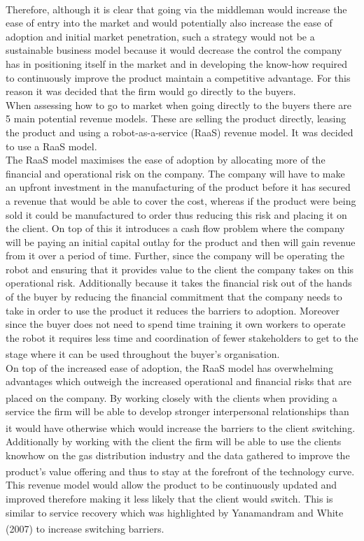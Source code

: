 \documentclass[11pt]{article}		%
\newcommand{\supercite}[1]{\textsuperscript{\cite{#1}}}		%
\begin{document}
            \\
            Therefore, although it is clear that going via the middleman would increase the ease of entry into the market and would potentially also increase the ease of adoption and initial market penetration, such a strategy would not be a sustainable business model because it would decrease the control the company has in positioning itself in the market and in developing the know-how required to continuously improve the product maintain a competitive advantage. For this reason it was decided that the firm would go directly to the buyers.
            \\
            When assessing how to go to market when going directly to the buyers there are 5 main potential revenue models. These are selling the product directly, leasing the product and using a robot-as-a-service (RaaS) revenue model.
            It was decided to use a RaaS model.
            \\
            The RaaS model maximises the ease of adoption by allocating more of the financial and operational risk on the company. The company will have to make an upfront investment in the manufacturing of the product before it has secured a revenue that would be able to cover the cost, whereas if the product were being sold it could be manufactured to order thus reducing this risk and placing it on the client. On top of this it introduces a cash flow problem where the company will be paying an initial capital outlay for the product and then will gain revenue from it over a period of time. Further, since the company will be operating the robot and ensuring that it provides value to the client the company takes on this operational risk. Additionally because it takes the financial risk out of the hands of the buyer by reducing the financial commitment that the company needs to take in order to use the product it reduces the barriers to adoption. Moreover since the buyer does not need to spend time training it own workers to operate the robot it requires less time and coordination of fewer stakeholders to get to the stage where it can be used throughout the buyer’s organisation.\supercite{RaaS}
            \\
            On top of the increased ease of adoption, the RaaS model has overwhelming advantages which outweigh the increased operational and financial risks that are placed on the company. \supercite{RaaS}By working closely with the clients when providing a service the firm will be able to develop stronger interpersonal relationships than it would have otherwise which would increase the barriers to the client switching. \supercite{B2Brelations} Additionally by working with the client the firm will be able to use the clients knowhow on the gas distribution industry and the data gathered to improve the product’s value offering and thus to stay at the forefront of the technology curve.\supercite{Barney} This revenue model would allow the product to be continuously updated and improved therefore making it less likely that the client would switch. This is similar to service recovery which was highlighted by Yanamandram and White (2007) \supercite{customers} to increase switching barriers.
\end{document}

